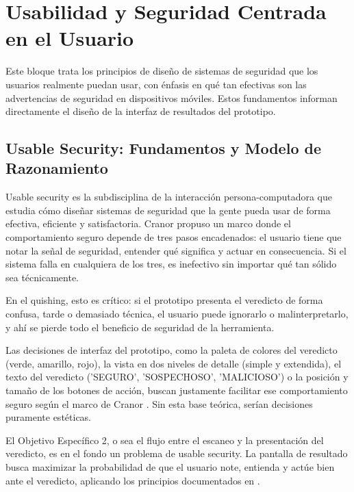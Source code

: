 \section{Usabilidad y Seguridad Centrada en el Usuario}

Este bloque trata los principios de dise\~no de sistemas de seguridad que los usuarios realmente puedan usar, con \'enfasis en qu\'e tan efectivas son las advertencias de seguridad en dispositivos m\'oviles. Estos fundamentos informan directamente el dise\~no de la interfaz de resultados del prototipo.

\subsection{Usable Security: Fundamentos y Modelo de Razonamiento}

Usable security es la subdisciplina de la interacci\'on persona-computadora que estudia c\'omo dise\~nar sistemas de seguridad que la gente pueda usar de forma efectiva, eficiente y satisfactoria. Cranor \cite{cranor2008framework} propuso un marco donde el comportamiento seguro depende de tres pasos encadenados: el usuario tiene que notar la se\~nal de seguridad, entender qu\'e significa y actuar en consecuencia. Si el sistema falla en cualquiera de los tres, es inefectivo sin importar qu\'e tan s\'olido sea t\'ecnicamente.

En el quishing, esto es cr\'itico: si el prototipo presenta el veredicto de forma confusa, tarde o demasiado t\'ecnica, el usuario puede ignorarlo o malinterpretarlo, y ah\'i se pierde todo el beneficio de seguridad de la herramienta.

Las decisiones de interfaz del prototipo, como la paleta de colores del veredicto (verde, amarillo, rojo), la vista en dos niveles de detalle (simple y extendida), el texto del veredicto ('SEGURO', 'SOSPECHOSO', 'MALICIOSO') o la posici\'on y tama\~no de los botones de acci\'on, buscan justamente facilitar ese comportamiento seguro seg\'un el marco de Cranor \cite{cranor2008framework}. Sin esta base te\'orica, ser\'ian decisiones puramente est\'eticas.

El Objetivo Espec\'ifico 2, o sea el flujo entre el escaneo y la presentaci\'on del veredicto, es en el fondo un problema de usable security. La pantalla de resultado busca maximizar la probabilidad de que el usuario note, entienda y act\'ue bien ante el veredicto, aplicando los principios documentados en \cite{cranor2008framework,egelman2008warned,akhawe2013alice}.

